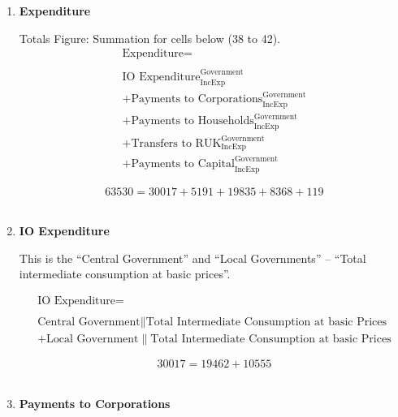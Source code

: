 \begin{enumerate}
\pagebreak

\item \textbf {Expenditure}

Totals Figure: Summation for cells below (38 to 42).\\

\begin{equation}
\begin{split}
\text{Expenditure} =  \\ \\
\text{IO Expenditure}^\text{Government}_\text{IncExp}\\
+\text{Payments to Corporations}^\text{Government}_\text{IncExp}\\
+\text{Payments to Households}^\text{Government}_\text{IncExp}\\
+\text{Transfers to RUK}^\text{Government}_\text{IncExp}\\
+\text{Payments to Capital}^\text{Government}_\text{IncExp}
\end{split} \label{eq:2.5.41}
\end{equation}

\begin{equation} \nonumber
63530 = 30017+5191+19835+8368+119
\end{equation}\\


\item \textbf {IO Expenditure}

This is the ``Central Government'' and ``Local Governments'' – ``Total intermediate consumption at basic prices''. \cite{ScotGov2013a}

\begin{equation}
\begin{split}
\text{IO Expenditure} =  \\ \\
\text{Central Government}\|\text{Total Intermediate Consumption at basic Prices}\\
+\text{Local Government}\|\text{Total Intermediate Consumption at basic Prices}
\end{split} \label{eq:2.5.42}
\end{equation}

\begin{equation} \nonumber
30017 = 19462+10555
\end{equation}\\


\item \textbf {Payments to  Corporations}


\end{enumerate}
